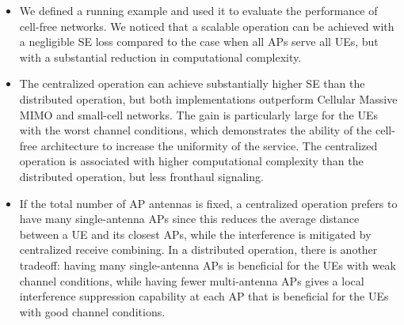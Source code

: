 \begin{mdframed}[style=GrayFrame]

\begin{itemize}

\item We defined a running example and used it to evaluate the performance of cell-free networks. We noticed that a scalable operation can be achieved with a negligible SE loss compared to the case when all APs serve all UEs, but with a substantial reduction in computational complexity.

\item The centralized operation can achieve substantially higher SE than the distributed operation, but both implementations outperform Cellular Massive MIMO and small-cell networks. The gain is particularly large for the UEs with the worst channel conditions, which demonstrates the ability of the cell-free architecture to increase the uniformity of the service. The centralized operation is associated with higher computational complexity than the distributed operation, but less fronthaul signaling.

\item If the total number of AP antennas is fixed, a centralized operation prefers to have many single-antenna APs since this reduces the average distance between a UE and its closest APs, while the interference is mitigated by centralized receive combining. In a distributed operation, there is another tradeoff: having many single-antenna APs is beneficial for the UEs with weak channel conditions, while having fewer multi-antenna APs gives a local interference suppression capability at each AP that is beneficial for the UEs with good channel conditions.

\end{itemize}

\end{mdframed}


